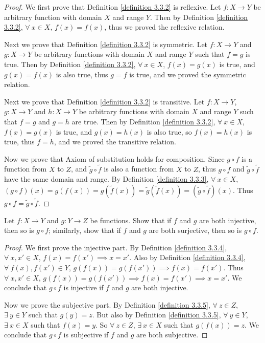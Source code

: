 \begin{proof}
We first prove that Definition \ref{definition 3.3.2} is reflexive.
Let \(f : X \to Y\) be arbitrary function with domain \(X\) and range \(Y\).
Then by Definition \ref{definition 3.3.2}, \(\forall\ x \in X\), \(f(x) = f(x)\), thus we proved the reflexive relation.

Next we prove that Definition \ref{definition 3.3.2} is symmetric.
Let \(f : X \to Y\) and \(g : X \to Y\) be arbitrary functions with domain \(X\) and range \(Y\) such that \(f = g\) is true.
Then by Definition \ref{definition 3.3.2}, \(\forall\ x \in X\), \(f(x) = g(x)\) is true, and \(g(x) = f(x)\) is also true, thus \(g = f\) is true, and we proved the symmetric relation.

Next we prove that Definition \ref{definition 3.3.2} is transitive.
Let \(f : X \to Y\), \(g : X \to Y\) and \(h : X \to Y\) be arbitrary functions with domain \(X\) and range \(Y\) such that \(f = g\) and \(g = h\) are true.
Then by Definition \ref{definition 3.3.2}, \(\forall\ x \in X\), \(f(x) = g(x)\) is true, and \(g(x) = h(x)\) is also true, so \(f(x) = h(x)\) is true, thus \(f = h\), and we proved the transitive relation.

Now we prove that Axiom of substitution holds for composition.
Since \(g \circ f\) is a function from \(X\) to \(Z\), and \(\tilde{g} \circ \tilde{f}\) is also a function from \(X\) to \(Z\), thus \(g \circ f\) and \(\tilde{g} \circ \tilde{f}\) have the same domain and range.
By Definition \ref{definition 3.3.3}, \(\forall\ x \in X\), \((g \circ f)(x) = g(f(x)) = g(\tilde{f}(x)) = \tilde{g}(\tilde{f}(x)) = (\tilde{g} \circ \tilde{f})(x)\).
Thus \(g \circ f = \tilde{g} \circ \tilde{f}\).
\end{proof}

\begin{exercise}\label{exercise 3.3.2}
Let \(f : X \to Y\) and \(g : Y \to Z\) be functions.
Show that if \(f\) and \(g\) are both injective, then so is \(g \circ f\);
similarly, show that if \(f\) and \(g\) are both surjective, then so is \(g \circ f\).
\end{exercise}

\begin{proof}
We first prove the injective part.
By Definition \ref{definition 3.3.4}, \(\forall\ x, x' \in X\), \(f(x) = f(x') \implies x = x'\).
Also by Definition \ref{definition 3.3.4}, \(\forall\ f(x), f(x') \in Y\), \(g(f(x)) = g(f(x')) \implies f(x) = f(x')\).
Thus \(\forall\ x, x' \in X\), \(g(f(x)) = g(f(x')) \implies f(x) = f(x')  \implies x = x'\).
We conclude that \(g \circ f\) is injective if \(f\) and \(g\) are both injective.

Now we prove the subjective part.
By Definition \ref{definition 3.3.5}, \(\forall\ z \in Z\), \(\exists\ y \in Y\) such that \(g(y) = z\).
But also by Definition \ref{definition 3.3.5}, \(\forall\ y \in Y\), \(\exists\ x \in X\) such that \(f(x) = y\).
So \(\forall\ z \in Z\), \(\exists\ x \in X\) such that \(g(f(x)) = z\).
We conclude that \(g \circ f\) is subjective if \(f\) and \(g\) are both subjective.
\end{proof}

